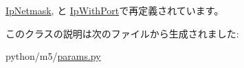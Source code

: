 \hyperlink{classm5_1_1params_1_1IpNetmask_afd65cf072a93c93ad52b9f25b341e10b}{IpNetmask}, と \hyperlink{classm5_1_1params_1_1IpWithPort_afd65cf072a93c93ad52b9f25b341e10b}{IpWithPort}で再定義されています。

このクラスの説明は次のファイルから生成されました:\begin{DoxyCompactItemize}
\item 
python/m5/\hyperlink{params_8py}{params.py}\end{DoxyCompactItemize}

